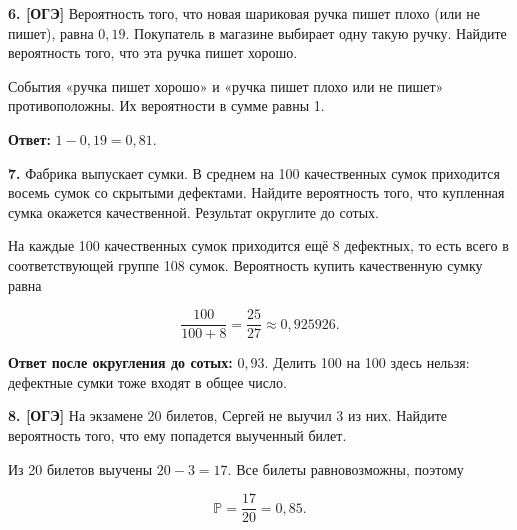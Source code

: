 \begin{task}\label{task-problems-6}
\textbf{6. [ОГЭ]} Вероятность того, что новая шариковая ручка пишет плохо (или не пишет), равна $0,19$. Покупатель в магазине выбирает одну такую ручку. Найдите вероятность того, что эта ручка пишет хорошо.
\end{task}

\begin{solution}\label{solution-equally-likely-outcomes-problems-6}
События «ручка пишет хорошо» и «ручка пишет плохо или не пишет» противоположны. Их вероятности в сумме равны 1.

\textbf{Ответ:} $1-0,19=0,81$.
\end{solution}

\begin{task}\label{task-problems-7}
\textbf{7.} Фабрика выпускает сумки. В среднем на 100 качественных сумок приходится восемь сумок со скрытыми дефектами. Найдите вероятность того, что купленная сумка окажется качественной. Результат округлите до сотых.
\end{task}

\begin{solution}\label{solution-equally-likely-outcomes-problems-7}
На каждые 100 качественных сумок приходится ещё 8 дефектных, то есть всего в соответствующей группе 108 сумок. Вероятность купить качественную сумку равна

\[\frac{100}{100+8}=\frac{25}{27}\approx0,925926.\]

\textbf{Ответ после округления до сотых:} $0,93$. Делить 100 на 100 здесь нельзя: дефектные сумки тоже входят в общее число.
\end{solution}

\begin{task}\label{task-problems-8}
\textbf{8. [ОГЭ]} На экзамене 20 билетов, Сергей не выучил 3 из них. Найдите вероятность того, что ему попадется выученный билет.
\end{task}

\begin{solution}\label{solution-equally-likely-outcomes-problems-8}
Из 20 билетов выучены $20-3=17$. Все билеты равновозможны, поэтому

\[\mathbb P=\frac{17}{20}=0,85.\]
\end{solution}

